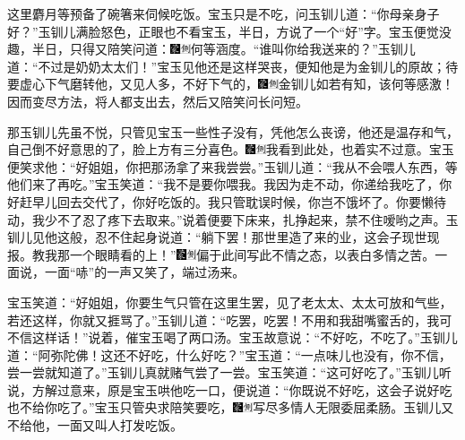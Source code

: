 这里麝月等预备了碗箸来伺候吃饭。宝玉只是不吃，问玉钏儿道：“你母亲身子好？”玉钏儿满脸怒色，正眼也不看宝玉，半日，方说了一个“好”字。宝玉便觉没趣，半日，只得又陪笑问道：{\includegraphics[width=3mm]{../Images/00006}\includegraphics[width=3mm]{../Images/00011}\footnotesize \kaishu 何等涵度。}“谁叫你给我送来的？”玉钏儿道：“不过是奶奶太太们！”宝玉见他还是这样哭丧，便知他是为金钏儿的原故；待要虚心下气磨转他，又见人多，不好下气的，{\includegraphics[width=3mm]{../Images/00006}\includegraphics[width=3mm]{../Images/00011}\footnotesize \kaishu 金钏儿如若有知，该何等感激！}因而变尽方法，将人都支出去，然后又陪笑问长问短。

那玉钏儿先虽不悦，只管见宝玉一些性子没有，凭他怎么丧谤，他还是温存和气，自己倒不好意思的了，脸上方有三分喜色。{\includegraphics[width=3mm]{../Images/00006}\includegraphics[width=3mm]{../Images/00011}\footnotesize \kaishu 我看到此处，也着实不过意。}宝玉便笑求他：“好姐姐，你把那汤拿了来我尝尝。”玉钏儿道：“我从不会喂人东西，等他们来了再吃。”宝玉笑道：“我不是要你喂我。我因为走不动，你递给我吃了，你好赶早儿回去交代了，你好吃饭的。我只管耽误时候，你岂不饿坏了。你要懒待动，我少不了忍了疼下去取来。”说着便要下床来，扎挣起来，禁不住嗳哟之声。玉钏儿见他这般，忍不住起身说道：“躺下罢！那世里造了来的业，这会子现世现报。教我那一个眼睛看的上！”{\includegraphics[width=3mm]{../Images/00006}\includegraphics[width=3mm]{../Images/00011}\footnotesize \kaishu 偏于此间写此不情之态，以表白多情之苦。}一面说，一面“哧”的一声又笑了，端过汤来。

宝玉笑道：“好姐姐，你要生气只管在这里生罢，见了老太太、太太可放和气些，若还这样，你就又捱骂了。”玉钏儿道：“吃罢，吃罢！不用和我甜嘴蜜舌的，我可不信这样话！”说着，催宝玉喝了两口汤。宝玉故意说：“不好吃，不吃了。”玉钏儿道：“阿弥陀佛！这还不好吃，什么好吃？”宝玉道：“一点味儿也没有，你不信，尝一尝就知道了。”玉钏儿真就赌气尝了一尝。宝玉笑道：“这可好吃了。”玉钏儿听说，方解过意来，原是宝玉哄他吃一口，便说道：“你既说不好吃，这会子说好吃也不给你吃了。”宝玉只管央求陪笑要吃，{\includegraphics[width=3mm]{../Images/00006}\includegraphics[width=3mm]{../Images/00011}\footnotesize \kaishu 写尽多情人无限委屈柔肠。}玉钏儿又不给他，一面又叫人打发吃饭。

